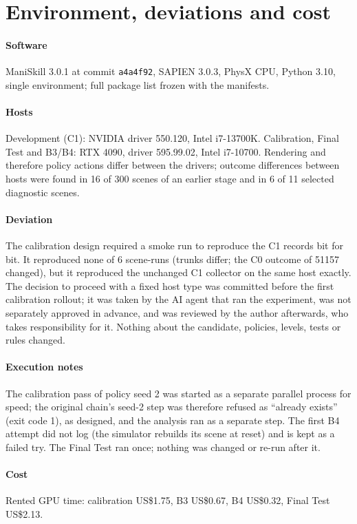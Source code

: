 \documentclass[preprint,12pt]{elsarticle}
\begin{document}
\section{Environment, deviations and cost}\label{sec:s-env}

\paragraph{Software} ManiSkill 3.0.1 at commit \texttt{a4a4f92}, SAPIEN 3.0.3, PhysX CPU, Python 3.10, single environment; full package list frozen with the manifests.

\paragraph{Hosts} Development (C1): NVIDIA driver 550.120, Intel i7-13700K. Calibration, Final Test and B3/B4: RTX 4090, driver 595.99.02, Intel i7-10700. Rendering and therefore policy actions differ between the drivers; outcome differences between hosts were found in 16 of 300 scenes of an earlier stage and in 6 of 11 selected diagnostic scenes.

\paragraph{Deviation} The calibration design required a smoke run to reproduce the C1 records bit for bit. It reproduced none of 6 scene-runs (trunks differ; the C0 outcome of 51157 changed), but it reproduced the unchanged C1 collector on the same host exactly. The decision to proceed with a fixed host type was committed before the first calibration rollout; it was taken by the AI agent that ran the experiment, was not separately approved in advance, and was reviewed by the author afterwards, who takes responsibility for it. Nothing about the candidate, policies, levels, tests or rules changed.

\paragraph{Execution notes} The calibration pass of policy seed 2 was started as a separate parallel process for speed; the original chain's seed-2 step was therefore refused as ``already exists'' (exit code 1), as designed, and the analysis ran as a separate step. The first B4 attempt did not log (the simulator rebuilds its scene at reset) and is kept as a failed try. The Final Test ran once; nothing was changed or re-run after it.

\paragraph{Cost} Rented GPU time: calibration US\$1.75, B3 US\$0.67, B4 US\$0.32, Final Test US\$2.13.
\end{document}
